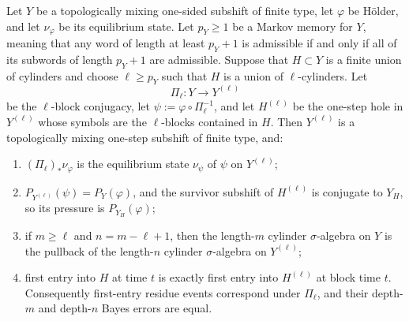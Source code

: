 \begin{lemma}
\label{lem:holder-block-reduction}
Let \(Y\) be a topologically mixing one-sided subshift of finite type,
let \(\varphi\) be H\"older, and let \(\nu_\varphi\) be its equilibrium
state.  Let \(p_Y\geq1\) be a Markov memory for \(Y\), meaning that
any word of length at least \(p_Y+1\) is admissible if and only if all
of its subwords of length \(p_Y+1\) are admissible.  Suppose that
\(H\subset Y\) is a finite union of cylinders and choose
\(\ell\geq p_Y\) such that \(H\) is a union of \(\ell\)-cylinders.
Let
\[
  \Pi_\ell:Y\longrightarrow Y^{(\ell)}
\]
be the \(\ell\)-block conjugacy, let
\(\psi:=\varphi\circ\Pi_\ell^{-1}\), and let \(H^{(\ell)}\) be the
one-step hole in \(Y^{(\ell)}\) whose symbols are the \(\ell\)-blocks
contained in \(H\).  Then \(Y^{(\ell)}\) is a topologically mixing
one-step subshift of finite type, and:
\begin{enumerate}[label=(\roman*)]
  \item \((\Pi_\ell)_\ast\nu_\varphi\) is the equilibrium state
    \(\nu_\psi\) of \(\psi\) on \(Y^{(\ell)}\);
  \item \(P_{Y^{(\ell)}}(\psi)=P_Y(\varphi)\), and the survivor subshift
    of \(H^{(\ell)}\) is conjugate to \(Y_H\), so its pressure is
    \(P_{Y_H}(\varphi)\);
  \item if \(m\geq\ell\) and \(n=m-\ell+1\), then the
    length-\(m\) cylinder \(\sigma\)-algebra on \(Y\) is the pullback of
    the length-\(n\) cylinder \(\sigma\)-algebra on \(Y^{(\ell)}\);
  \item first entry into \(H\) at time \(t\) is exactly first entry into
    \(H^{(\ell)}\) at block time \(t\).  Consequently first-entry residue
    events correspond under \(\Pi_\ell\), and their depth-\(m\) and
    depth-\(n\) Bayes errors are equal.
\end{enumerate}
\end{lemma}

